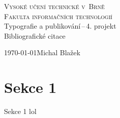 \documentclass[a4paper, 11pt]{article}
\begin{document}
\begin{titlepage}
\begin{center}
    \Huge
    \textsc{Vysoké učení technické v~Brně\\
    \huge{Fakulta informačních technologií}}\\
    \LARGE{Typografie a publikování\,--\,4. projekt}\\
    \Huge{Bibliografické citace}\\
\end{center}
{\Large \today \hfill Michal Blažek}
\end{titlepage}

\section{Sekce 1}

Sekce 1 lol

\newpage



\end{document}
